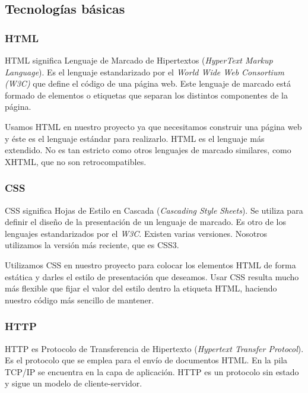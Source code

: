 \subsection{Tecnologías básicas}

\subsubsection{HTML}
HTML significa Lenguaje de Marcado de Hipertextos (\textit{HyperText Markup Language}). Es el lenguaje estandarizado por el \textit{World Wide Web Consortium (W3C)} que define el código de una página web. Este lenguaje de marcado está formado de elementos o etiquetas que separan los distintos componentes de la página. \par

Usamos HTML en nuestro proyecto ya que necesitamos construir una página web y éste es el lenguaje estándar para realizarlo. HTML es el lenguaje más extendido. No es tan estricto como otros lenguajes de marcado similares, como XHTML, que no son retrocompatibles. \par

\subsubsection{CSS}
CSS significa Hojas de Estilo en Cascada (\textit{Cascading Style Sheets}). Se utiliza para definir el diseño de la presentación de un lenguaje de marcado. Es otro de los lenguajes estandarizados por el \textit{W3C}. Existen varias versiones. Nosotros utilizamos la versión más reciente, que es CSS3. \par 

Utilizamos CSS en nuestro proyecto para colocar los elementos HTML de forma estática y darles el estilo de presentación que deseamos. Usar CSS resulta mucho más flexible que fijar el valor del estilo dentro la etiqueta HTML, haciendo nuestro código más sencillo de mantener. \par

\subsubsection{HTTP}
HTTP es Protocolo de Transferencia de Hipertexto (\textit{Hypertext Transfer Protocol}). Es el protocolo que se emplea para el envío de documentos HTML. En la pila TCP/IP se encuentra en la capa de aplicación. HTTP es un protocolo sin estado y sigue un modelo de cliente-servidor.  \par

